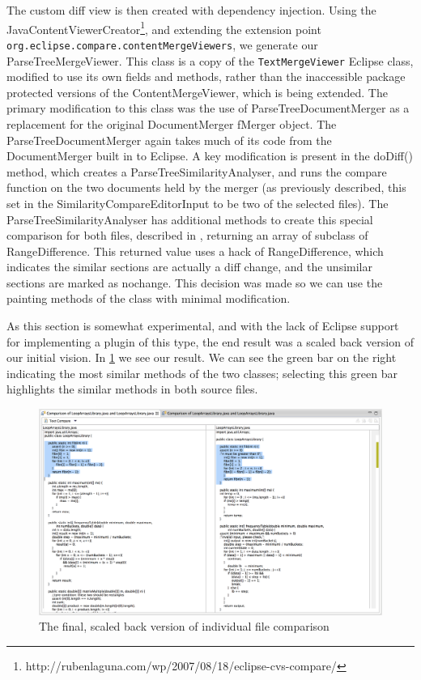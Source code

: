 The custom diff view is then created with dependency injection. Using the
JavaContentViewerCreator\footnote{http://rubenlaguna.com/wp/2007/08/18/eclipse-cvs-compare/}, and extending the extension point
\texttt{org.eclipse.compare.contentMergeViewers}, we generate our ParseTreeMergeViewer.
This class is a copy of the \texttt{TextMergeViewer} Eclipse class, modified to use
its own fields and methods, rather than the inaccessible package protected versions
of the ContentMergeViewer, which is being extended. The primary modification
to this class was the use of ParseTreeDocumentMerger as a replacement for the
original DocumentMerger fMerger object. The ParseTreeDocumentMerger again takes
much of its code from the DocumentMerger built in to Eclipse. A key modification
is present in the doDiff() method, which creates a ParseTreeSimilarityAnalyser,
and runs the compare function on the two documents held by the merger (as 
previously described, this set in the SimilarityCompareEditorInput to be
two of the selected files). The ParseTreeSimilarityAnalyser has additional
methods to create this special comparison for both files, described in 
, returning an array of subclass of RangeDifference.
This returned value uses a hack of RangeDifference, which indicates the similar
sections are actually a diff change, and the unsimilar sections are marked
as nochange. This decision was made so we can use the painting methods of the
class with minimal modification.

As this section is somewhat experimental, and with the lack of Eclipse
support for implementing a plugin of this type, the end result was a scaled
back version of our initial vision. In \cref{fig:finalCodeCompare} we see
our result. We can see the green bar on the right indicating the most similar
methods of the two classes; selecting this green bar highlights the similar
methods in both source files.

\begin{figure}[H]
	\centering
		\includegraphics[width=\textwidth]{Figures/FinalCodeCompare}
	\caption{The final, scaled back version of individual file comparison}
	\label{fig:finalCodeCompare}
\end{figure}


